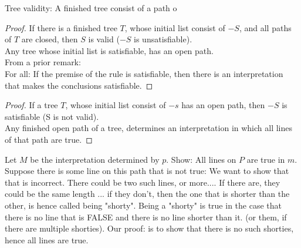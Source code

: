 Tree validity: A finished tree consist of a path o

\begin{lemma}[Completeness]
\begin{remark}
\begin{proof}
If there is a finished tree $T$, whose initial list consist of $-S$, and all paths of $T$ are closed, then $S$ is valid ($-S$ is unsatisfiable). \\
Any tree whose initial list is satisfiable, has an open path. \\
From a prior remark:\\
\hspace{0.5cm} For all: If the premise of the rule is satisfiable, then there is an interpretation that makes the conclusions satisfiable.
\end{proof}
\end{remark}

\begin{remark}
\begin{proof}
If a tree $T$, whose initial list consist of $-s$ has an open path, then $-S$ is satisfiable (S is not valid). \\
Any finished open path of a tree, determines an interpretation in which all lines of that path are true.
\end{proof}
\end{remark}

\end{lemma}

Let $M$ be the interpretation determined by $p$. Show: All lines on $P$ are true in $m$. \\
Suppose there is some line on this path that is not true: We want to show that that is incorrect. There could be two such lines, or more....  If there are, they could be the same length ... if they don't, then the one that is shorter than the other, is hence called being "shorty". Being a "shorty" is true in the case that there is no line that is FALSE and there is no line shorter than it. (or them, if there are multiple shorties).
Our proof: is to show that there is no such shorties, hence all lines are true.

